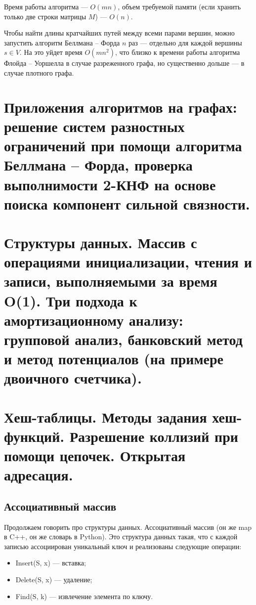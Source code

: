 \documentclass[a4paper,12pt]{article}
\begin{document}
Время работы алгоритма --- $O(mn)$, объем требуемой памяти (если хранить только две строки матрицы $M$) --- $O(n)$.

Чтобы найти длины кратчайших путей между всеми парами вершин, можно запустить алгоритм Беллмана -- Форда $n$ раз --- отдельно для каждой вершины $s \in V$. На это уйдет время $O(mn^2)$, что близко к времени работы алгоритма Флойда -- Уоршелла в случае разреженного графа, но существенно дольше --- в случае плотного графа.

\newpage
\section{Приложения алгоритмов на графах: решение систем разностных ограничений при помощи алгоритма Беллмана – Форда, проверка выполнимости 2-КНФ на основе поиска компонент сильной связности.}
\newpage
\section{Структуры данных. Массив с операциями инициализации, чтения и записи, выполняемыми за время O(1). Три подхода к амортизационному анализу: групповой анализ, банковский метод и метод потенциалов (на примере двоичного счетчика).}

\newpage
\section{Хеш-таблицы. Методы задания хеш-функций. Разрешение коллизий при помощи цепочек. Открытая адресация.}

\subsection{Ассоциативный массив}

Продолжаем говорить про структуры данных. Ассоциативный массив (он же map в C++, он же словарь в Python). Это структура данных такая, что с каждой записью ассоциирован уникальный ключ и реализованы следующие операции:

\begin{itemize}
    \item Insert(S, x) --- вставка;

    \item Delete(S, x) --- удаление;

    \item Find(S, k) --- извлечение элемента по ключу.
\end{itemize}
\end{document}
